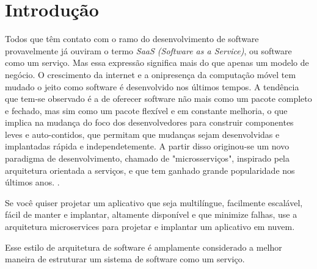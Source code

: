 \chapter{Introdução}\label{chapter-introducao}

Todos que têm contato com o ramo do desenvolvimento de software provavelmente já ouviram o termo \emph{SaaS (Software as a Service)}, ou software como um serviço. Mas essa expressão significa mais do que apenas um modelo de negócio. O crescimento da internet e a onipresença da computação móvel tem mudado o jeito como software é desenvolvido nos últimos tempos. A tendência que tem-se observado é a de oferecer software não mais como um pacote completo e fechado, mas sim como um pacote flexível e em constante melhoria, o que implica na mudança do foco dos desenvolvedores para construir componentes leves e auto-contidos, que permitam que mudanças sejam desenvolvidas e implantadas rápida e independetemente. A partir disso originou-se um novo paradigma de desenvolvimento, chamado de "microsserviços", inspirado pela arquitetura orientada a serviços, e que tem ganhado grande popularidade nos últimos anos. \cite{middleware-microservices,design-monitoring-testing-waseem}.

\begin{citacao}
    Se você quiser projetar um aplicativo que seja multilíngue, facilmente escalável, fácil de manter e implantar, altamente disponível e que minimize falhas, use a arquitetura microservices para projetar e implantar um aplicativo em nuvem. \cite{oracle_microservices}
\end{citacao}

Esse estilo de arquitetura de software é amplamente considerado a melhor maneira de estruturar um sistema de software como um serviço. \cite{CAOPLE}




